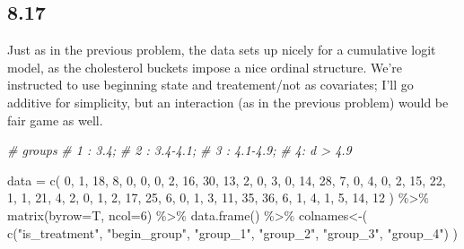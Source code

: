 \documentclass[
]{article}
\newenvironment{Shaded}{\begin{snugshade}}{\end{snugshade}}
\newcommand{\AttributeTok}[1]{\textcolor[rgb]{0.77,0.63,0.00}{#1}}
\newcommand{\CommentTok}[1]{\textcolor[rgb]{0.56,0.35,0.01}{\textit{#1}}}
\newcommand{\DecValTok}[1]{\textcolor[rgb]{0.00,0.00,0.81}{#1}}
\newcommand{\FunctionTok}[1]{\textcolor[rgb]{0.00,0.00,0.00}{#1}}
\newcommand{\NormalTok}[1]{#1}
\newcommand{\OtherTok}[1]{\textcolor[rgb]{0.56,0.35,0.01}{#1}}
\newcommand{\SpecialCharTok}[1]{\textcolor[rgb]{0.00,0.00,0.00}{#1}}
\newcommand{\StringTok}[1]{\textcolor[rgb]{0.31,0.60,0.02}{#1}}
\begin{document}
\hypertarget{section-2}{%
\subsection{8.17}\label{section-2}}

Just as in the previous problem, the data sets up nicely for a
cumulative logit model, as the cholesterol buckets impose a nice ordinal
structure. We're instructed to use beginning state and treatement/not as
covariates; I'll go additive for simplicity, but an interaction (as in
the previous problem) would be fair game as well.

\begin{Shaded}
\begin{Highlighting}[]
\CommentTok{\# groups}
\CommentTok{\# 1 : 3.4; }
\CommentTok{\# 2 : 3.4{-}4.1; }
\CommentTok{\# 3 : 4.1{-}4.9; }
\CommentTok{\# 4: d \textgreater{} 4.9}

\NormalTok{data }\OtherTok{=} \FunctionTok{c}\NormalTok{(}
    \DecValTok{0}\NormalTok{, }\DecValTok{1}\NormalTok{, }\DecValTok{18}\NormalTok{, }\DecValTok{8}\NormalTok{, }\DecValTok{0}\NormalTok{, }\DecValTok{0}\NormalTok{,}
    \DecValTok{0}\NormalTok{, }\DecValTok{2}\NormalTok{, }\DecValTok{16}\NormalTok{, }\DecValTok{30}\NormalTok{, }\DecValTok{13}\NormalTok{, }\DecValTok{2}\NormalTok{,}
    \DecValTok{0}\NormalTok{, }\DecValTok{3}\NormalTok{, }\DecValTok{0}\NormalTok{, }\DecValTok{14}\NormalTok{, }\DecValTok{28}\NormalTok{, }\DecValTok{7}\NormalTok{,}
    \DecValTok{0}\NormalTok{, }\DecValTok{4}\NormalTok{, }\DecValTok{0}\NormalTok{, }\DecValTok{2}\NormalTok{, }\DecValTok{15}\NormalTok{, }\DecValTok{22}\NormalTok{,}
    \DecValTok{1}\NormalTok{, }\DecValTok{1}\NormalTok{, }\DecValTok{21}\NormalTok{, }\DecValTok{4}\NormalTok{, }\DecValTok{2}\NormalTok{, }\DecValTok{0}\NormalTok{,}
    \DecValTok{1}\NormalTok{, }\DecValTok{2}\NormalTok{, }\DecValTok{17}\NormalTok{, }\DecValTok{25}\NormalTok{, }\DecValTok{6}\NormalTok{, }\DecValTok{0}\NormalTok{,}
    \DecValTok{1}\NormalTok{, }\DecValTok{3}\NormalTok{, }\DecValTok{11}\NormalTok{, }\DecValTok{35}\NormalTok{, }\DecValTok{36}\NormalTok{, }\DecValTok{6}\NormalTok{,}
    \DecValTok{1}\NormalTok{, }\DecValTok{4}\NormalTok{, }\DecValTok{1}\NormalTok{, }\DecValTok{5}\NormalTok{, }\DecValTok{14}\NormalTok{, }\DecValTok{12}
\NormalTok{  ) }\SpecialCharTok{\%\textgreater{}\%}
  \FunctionTok{matrix}\NormalTok{(}\AttributeTok{byrow=}\NormalTok{T, }\AttributeTok{ncol=}\DecValTok{6}\NormalTok{) }\SpecialCharTok{\%\textgreater{}\%}
  \FunctionTok{data.frame}\NormalTok{() }\SpecialCharTok{\%\textgreater{}\%}
  \StringTok{\textasciigrave{}}\AttributeTok{colnames\textless{}{-}}\StringTok{\textasciigrave{}}\NormalTok{(}
    \FunctionTok{c}\NormalTok{(}\StringTok{"is\_treatment"}\NormalTok{, }\StringTok{"begin\_group"}\NormalTok{, }\StringTok{"group\_1"}\NormalTok{, }
      \StringTok{"group\_2"}\NormalTok{, }\StringTok{"group\_3"}\NormalTok{, }\StringTok{"group\_4"}\NormalTok{)}
\NormalTok{    )}


\end{Highlighting}
\end{Shaded}
\end{document}
